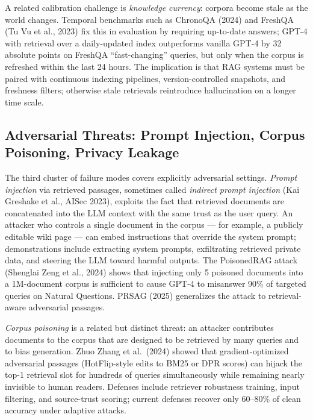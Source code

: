 A related calibration challenge is \emph{knowledge currency}: corpora become stale as the world changes. Temporal benchmarks such as ChronoQA (2024) and FreshQA (Tu Vu et al., 2023) fix this in evaluation by requiring up-to-date answers; GPT-4 with retrieval over a daily-updated index outperforms vanilla GPT-4 by 32 absolute points on FreshQA ``fast-changing'' queries, but only when the corpus is refreshed within the last 24 hours. The implication is that RAG systems must be paired with continuous indexing pipelines, version-controlled snapshots, and freshness filters; otherwise stale retrievals reintroduce hallucination on a longer time scale.

\subsection{Adversarial Threats: Prompt Injection, Corpus Poisoning, Privacy Leakage}\label{adversarial-threats-prompt-injection-corpus-poisoning-privacy-leakage}

The third cluster of failure modes covers explicitly adversarial settings. \emph{Prompt injection} via retrieved passages, sometimes called \emph{indirect prompt injection} (Kai Greshake et al., AISec 2023), exploits the fact that retrieved documents are concatenated into the LLM context with the same trust as the user query. An attacker who controls a single document in the corpus --- for example, a publicly editable wiki page --- can embed instructions that override the system prompt; demonstrations include extracting system prompts, exfiltrating retrieved private data, and steering the LLM toward harmful outputs. The PoisonedRAG attack (Shenglai Zeng et al., 2024) shows that injecting only 5 poisoned documents into a 1M-document corpus is sufficient to cause GPT-4 to misanswer 90\% of targeted queries on Natural Questions. PRSAG (2025) generalizes the attack to retrieval-aware adversarial passages.

\emph{Corpus poisoning} is a related but distinct threat: an attacker contributes documents to the corpus that are designed to be retrieved by many queries and to bias generation. Zhuo Zhang et al.~(2024) showed that gradient-optimized adversarial passages (HotFlip-style edits to BM25 or DPR scores) can hijack the top-1 retrieval slot for hundreds of queries simultaneously while remaining nearly invisible to human readers. Defenses include retriever robustness training, input filtering, and source-trust scoring; current defenses recover only 60--80\% of clean accuracy under adaptive attacks.

